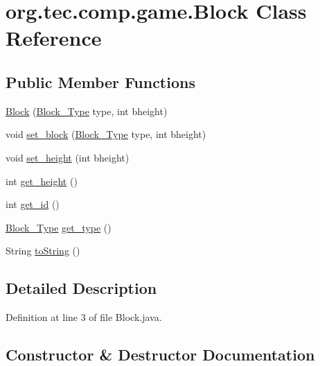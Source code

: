 \hypertarget{classorg_1_1tec_1_1comp_1_1game_1_1_block}{}\section{org.\+tec.\+comp.\+game.\+Block Class Reference}
\label{classorg_1_1tec_1_1comp_1_1game_1_1_block}
\subsection*{Public Member Functions}
\begin{DoxyCompactItemize}
\item 
\mbox{\hyperlink{classorg_1_1tec_1_1comp_1_1game_1_1_block_ab00f7a03b6ec31efc889f0b93b997755}{Block}} (\mbox{\hyperlink{enumorg_1_1tec_1_1comp_1_1game_1_1_block___type}{Block\+\_\+\+Type}} type, int bheight)
\item 
void \mbox{\hyperlink{classorg_1_1tec_1_1comp_1_1game_1_1_block_aa387f6f79daa3d927a37137fda4a18f8}{set\+\_\+block}} (\mbox{\hyperlink{enumorg_1_1tec_1_1comp_1_1game_1_1_block___type}{Block\+\_\+\+Type}} type, int bheight)
\item 
void \mbox{\hyperlink{classorg_1_1tec_1_1comp_1_1game_1_1_block_a17d0c6c7e15dabbe80be037e520f3f04}{set\+\_\+height}} (int bheight)
\item 
int \mbox{\hyperlink{classorg_1_1tec_1_1comp_1_1game_1_1_block_a8ac9d4793a41d16e79c7398b7339099a}{get\+\_\+height}} ()
\item 
int \mbox{\hyperlink{classorg_1_1tec_1_1comp_1_1game_1_1_block_ad1eb7eb62b4b45ba63213e7a977f0c26}{get\+\_\+id}} ()
\item 
\mbox{\hyperlink{enumorg_1_1tec_1_1comp_1_1game_1_1_block___type}{Block\+\_\+\+Type}} \mbox{\hyperlink{classorg_1_1tec_1_1comp_1_1game_1_1_block_a988225960b535c3feb106250ffeee81f}{get\+\_\+type}} ()
\item 
String \mbox{\hyperlink{classorg_1_1tec_1_1comp_1_1game_1_1_block_a5f578cf17605556a0bf2ff93037e21f8}{to\+String}} ()
\end{DoxyCompactItemize}


\subsection{Detailed Description}


Definition at line 3 of file Block.\+java.



\subsection{Constructor \& Destructor Documentation}
\mbox{\label{classorg_1_1tec_1_1comp_1_1game_1_1_block_ab00f7a03b6ec31efc889f0b93b997755}} 
